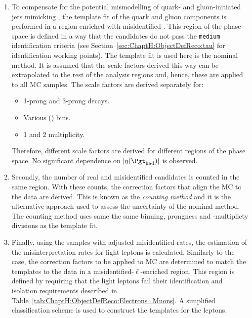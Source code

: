 \begin{enumerate}
	\item To compensate for the potential mismodelling of quark- and gluon-initiated jets mimicking \tauhad, 
		the template fit of the quark and gluon components is performed in a region enriched with 
		misidentified-\tauhad. This region of the phase space is defined in a way that the \tauhad candidates
		do not pass the \texttt{medium} identification criteria (see Section~\ref{sec:ChaptH:ObjectDefReco:tau}
		for identification working points).
		The template fit is used here is the nominal method. It is assumed that the scale factors derived this 
		way can be extrapolated to the rest
		of the analysis regions and, hence, these are applied to all MC samples.
		The scale factors are derived separately for:  
		\begin{itemize}
			\item 1-prong and 3-prong \tauhad decays. 
			\item  Various \pT(\tauhad) bins.
			\item  1 and 2 \bjets multiplicity.
		\end{itemize}
		Therefore, different scale factors are derived for different regions of the phase space. 
		No significant dependence on $|\eta(\tauhad)|$ is observed.


	\item Secondly, the number of real and misidentified \tauhad candidates is counted in the same region.
		With these counts, the correction factors
		that align the MC to the data are derived.
		This is known as the \textit{counting method} and it is the alternative approach
		used to assess the uncertainty of the nominal method.
		The counting method uses same the same binning, prongness and \bjet-multiplicty divisions 
		as the template fit.
		
		
	\item Finally, using the samples with adjusted misidentified-\tauhad rates, the estimation of the 
		misinterpretation rates for light leptons is calculated. Similarly to the \tauhad case,
		the correction factors to be applied to MC are determined to match the templates to the data in a 
		misidentified-$\ell$-enriched region.
		This region is defined by requiring that the light leptons fail their 
		identification and isolation requirements described in 
		Table~\ref{tab:ChaptH:ObjectDefReco:Electrons_Muons}.
		 A simplified classification scheme is used to construct the templates
		for the leptons.
\end{enumerate}




